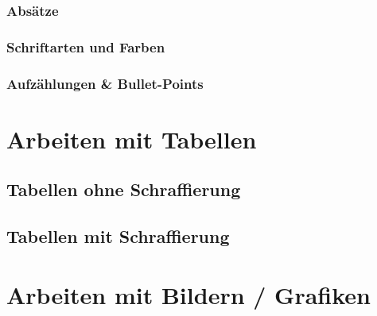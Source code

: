 \documentclass[12pt, a4paper, sectionentrydots=true, listof=totoc, listof=entryprefix, numbers=endperiod]{scrartcl}
\begin{document}
\subsubsection{Absätze}
\begin{spacing}{1.25}

\end{spacing}
%
%
\subsubsection{Schriftarten und Farben}
\begin{spacing}{1.25}

\end{spacing}
%
%
\subsubsection{Aufzählungen \& Bullet-Points}
\begin{spacing}{1.25}

\end{spacing}
%
%
%
%
%
\pagebreak 
\section{Arbeiten mit Tabellen}
\begin{spacing}{1.25}

\end{spacing}
%
%
\subsection{Tabellen ohne Schraffierung}
\begin{spacing}{1.25}

\end{spacing}
%
%
\subsection{Tabellen mit Schraffierung}
\begin{spacing}{1.25}

\end{spacing}
%
%
%
%
%
%
\pagebreak 
\section{Arbeiten mit Bildern / Grafiken}
\begin{spacing}{1.25}

\end{spacing}
%
%
%
%
%
%
\pagebreak 
\end{document}
